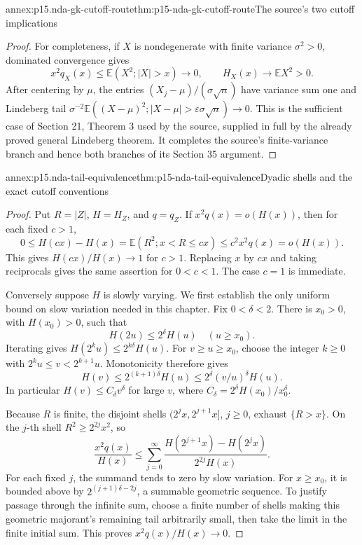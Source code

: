 \begin{annexitem}{annex:p15.nda-gk-cutoff-route}{thm:p15-nda-gk-cutoff-route}{The source's two cutoff implications}
\begin{proof}
For completeness, if \(X\) is nondegenerate with finite variance
\(\sigma^2>0\), dominated convergence gives
\[
 x^2q_X(x)\leq\mathbb E(X^2;|X|>x)\to0,\qquad
 H_X(x)\to\mathbb EX^2>0.
 \]
After centering by \(\mu\), the entries
\((X_j-\mu)/(\sigma\sqrt n)\) have variance sum one and
Lindeberg tail
\(\sigma^{-2}\mathbb E((X-\mu)^2;
|X-\mu|>\varepsilon\sigma\sqrt n)\to0\).
This is the sufficient case of Section 21, Theorem 3 used by
the source, supplied in full by the already proved general
Lindeberg theorem. It completes the source's finite-variance
branch and hence both branches of its Section 35 argument.
\end{proof}
\end{annexitem}

\begin{annexitem}{annex:p15.nda-tail-equivalence}{thm:p15-nda-tail-equivalence}{Dyadic shells and the exact cutoff conventions}
\begin{proof}
Put \(R=|Z|\), \(H=H_Z\), and \(q=q_Z\).
If \(x^2q(x)=o(H(x))\), then for each fixed \(c>1\),
\[
 0\leq H(cx)-H(x)
 =\mathbb E(R^2;x<R\leq cx)
 \leq c^2x^2q(x)=o(H(x)).
 \]
This gives \(H(cx)/H(x)\to1\) for \(c>1\).
Replacing \(x\) by \(cx\) and taking reciprocals gives the
same assertion for \(0<c<1\). The case \(c=1\) is immediate.

Conversely suppose \(H\) is slowly varying. We first establish
the only uniform bound on slow variation needed in this chapter.
Fix \(0<\delta<2\). There is \(x_0>0\), with \(H(x_0)>0\),
such that
\[
 H(2u)\leq2^\delta H(u)\quad(u\geq x_0).
 \]
Iterating gives \(H(2^ku)\leq2^{k\delta}H(u)\).
For \(v\geq u\geq x_0\), choose the integer \(k\geq0\)
with \(2^ku\leq v<2^{k+1}u\). Monotonicity therefore gives
\[
 H(v)\leq2^{(k+1)\delta}H(u)
                    \leq2^\delta(v/u)^\delta H(u).                 \tag{*}
 \]
In particular \(H(v)\leq C_\delta v^\delta\) for large \(v\),
where \(C_\delta=2^\delta H(x_0)/x_0^\delta\).

Because \(R\) is finite, the disjoint shells
\((2^jx,2^{j+1}x]\), \(j\geq0\), exhaust \(\{R>x\}\).
On the \(j\)-th shell \(R^2\geq 2^{2j}x^2\), so
\[
 \frac{x^2q(x)}{H(x)}
 \leq\sum_{j=0}^\infty
 \frac{H(2^{j+1}x)-H(2^jx)}{2^{2j}H(x)}.
 \]
For each fixed \(j\), the summand tends to zero by slow variation.
For \(x\geq x_0\), it is bounded above by
\(2^{(j+1)\delta-2j}\), a summable geometric sequence.
To justify passage through the infinite sum, choose a finite
number of shells making this geometric majorant's remaining
tail arbitrarily small, then take the limit in the finite initial
sum. This proves \(x^2q(x)/H(x)\to0\).


\end{proof}
\end{annexitem}
